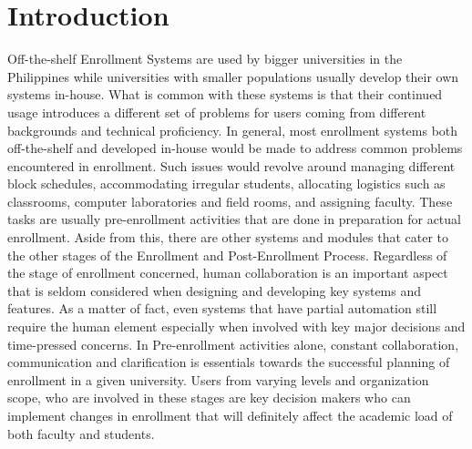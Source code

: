 \section{Introduction}
Off-the-shelf Enrollment Systems are used by bigger universities in the Philippines while universities with smaller populations usually develop their own systems in-house. What is common with these systems is that their continued usage introduces a different set of problems for users coming from different backgrounds and technical proficiency. In general, most enrollment systems both off-the-shelf and developed in-house would be made to address common problems encountered in enrollment. Such issues would revolve around managing different block schedules, accommodating irregular students, allocating logistics such as classrooms, computer laboratories and field rooms, and assigning faculty. These tasks are usually pre-enrollment activities that are done in preparation for actual enrollment. Aside from this, there are other systems and modules that cater to the other stages of the Enrollment and Post-Enrollment Process. Regardless of the stage of enrollment concerned, human collaboration is an important aspect that is seldom considered when designing and developing key systems and features. As a matter of fact, even systems that have partial automation still require the human element especially when involved with key major decisions and time-pressed concerns. In Pre-enrollment activities alone, constant collaboration, communication and clarification is essentials towards the successful planning of enrollment in a given university. Users from varying levels and organization scope, who are involved in these stages are key decision makers who can implement changes in enrollment that will definitely affect the academic load of both faculty and students. 

